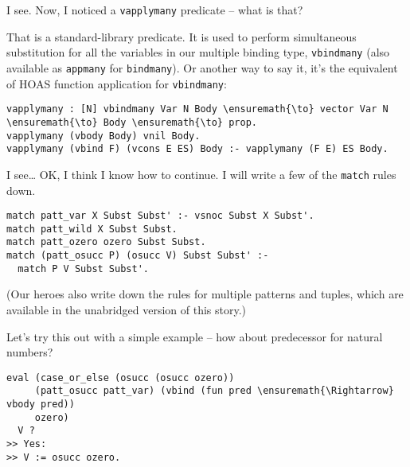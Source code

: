 \heroSTUDENT{} I see. Now, I noticed a \texttt{vapplymany} predicate -- what
is that?

\heroADVISOR{} That is a standard-library predicate. It is used to perform
simultaneous substitution for all the variables in our multiple binding
type, \texttt{vbindmany} (also available as \texttt{appmany} for
\texttt{bindmany}). Or another way to say it, it's the equivalent of
HOAS function application for \texttt{vbindmany}:

\begin{verbatim}
vapplymany : [N] vbindmany Var N Body \ensuremath{\to} vector Var N \ensuremath{\to} Body \ensuremath{\to} prop.
vapplymany (vbody Body) vnil Body.
vapplymany (vbind F) (vcons E ES) Body :- vapplymany (F E) ES Body.
\end{verbatim}

\heroSTUDENT{} I see\ldots{} OK, I think I know how to continue. I will write
a few of the \texttt{match} rules down.

\begin{verbatim}
match patt_var X Subst Subst' :- vsnoc Subst X Subst'.
match patt_wild X Subst Subst.
match patt_ozero ozero Subst Subst.
match (patt_osucc P) (osucc V) Subst Subst' :-
  match P V Subst Subst'.
\end{verbatim}

\begin{scenecomment}
(Our heroes also write down the rules for multiple patterns and tuples, which are
available in the unabridged version of this story.)
\end{scenecomment}

\heroSTUDENT{} Let's try this out with a simple example -- how about
predecessor for natural numbers?

\begin{verbatim}
eval (case_or_else (osucc (osucc ozero))
     (patt_osucc patt_var) (vbind (fun pred \ensuremath{\Rightarrow} vbody pred))
     ozero)
  V ?
>> Yes:
>> V := osucc ozero.
\end{verbatim}
